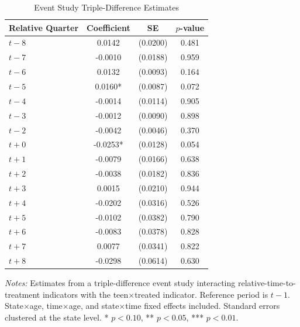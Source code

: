 \begin{table}[htbp]
\centering
\caption{Event Study Triple-Difference Estimates}
\label{tab:eventstudy}
\begin{threeparttable}
\begin{tabular}{lccc}
\toprule
Relative Quarter & Coefficient & SE & $p$-value \\
\midrule
$t-8$ & 0.0142 & (0.0200) & 0.481 \\
$t-7$ & -0.0010 & (0.0188) & 0.959 \\
$t-6$ & 0.0132 & (0.0093) & 0.164 \\
$t-5$ & 0.0160* & (0.0087) & 0.072 \\
$t-4$ & -0.0014 & (0.0114) & 0.905 \\
$t-3$ & -0.0012 & (0.0090) & 0.898 \\
$t-2$ & -0.0042 & (0.0046) & 0.370 \\
$t+0$ & -0.0253* & (0.0128) & 0.054 \\
$t+1$ & -0.0079 & (0.0166) & 0.638 \\
$t+2$ & -0.0038 & (0.0182) & 0.836 \\
$t+3$ & 0.0015 & (0.0210) & 0.944 \\
$t+4$ & -0.0202 & (0.0316) & 0.526 \\
$t+5$ & -0.0102 & (0.0382) & 0.790 \\
$t+6$ & -0.0083 & (0.0378) & 0.828 \\
$t+7$ & 0.0077 & (0.0341) & 0.822 \\
$t+8$ & -0.0298 & (0.0614) & 0.630 \\
\bottomrule
\end{tabular}
\begin{tablenotes}[flushleft]
\small
\item \textit{Notes:} Estimates from a triple-difference event study interacting relative-time-to-treatment indicators with the teen$\times$treated indicator. Reference period is $t-1$. State$\times$age, time$\times$age, and state$\times$time fixed effects included. Standard errors clustered at the state level. * $p<0.10$, ** $p<0.05$, *** $p<0.01$.
\end{tablenotes}
\end{threeparttable}
\end{table}

